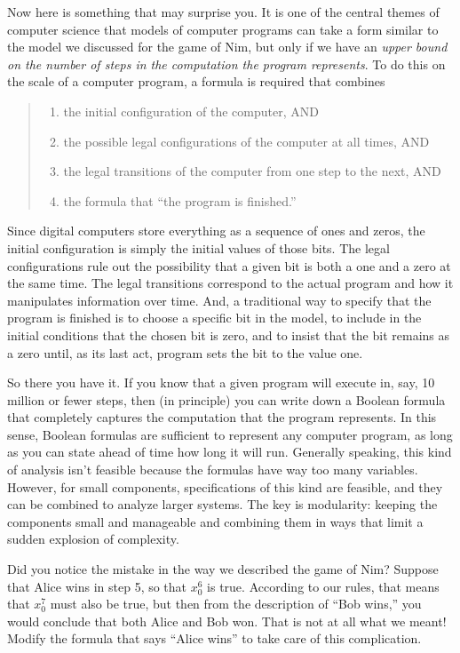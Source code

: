 {{Now here is something that may surprise you.
It is one of the central themes of computer science
that models of computer programs can take a form
similar to the model we discussed for the game of Nim,
but only if we have an \emph{upper bound on the number of
steps in the computation the program represents}.
To do this on the scale of a computer program,
a formula is required that combines
\begin{quote}
\begin{enumerate}
\item the initial configuration of the computer, AND
\item the possible legal configurations of the computer at all times, AND
\item the legal transitions of the computer from one step to the next, AND
\item the formula that ``the program is finished.''
\end{enumerate}
\end{quote}

Since digital computers store everything as a sequence of ones and zeros,
the initial configuration is simply the initial values of those bits.
The legal configurations rule out the possibility that a given bit is both a
one and a zero at the same time.
The legal transitions correspond to the actual program and how it manipulates information
over time. And, a traditional way to specify that the program is finished
is to choose a specific bit in the model, to include in the initial conditions
that the chosen bit is zero, and to insist that
the bit remains as a zero until, as its last act,
program sets the bit to the value one.

So there you have it.
If you know that a given program will execute in, say, 10 million or fewer steps,
then (in principle) you can
write down a Boolean formula that completely captures the computation
that the program represents.
In this sense, Boolean formulas are sufficient to
represent any computer program,
as long as you can state ahead of time how long it will run.
Generally speaking, this kind of analysis isn't feasible
because the formulas have way too many variables.
However, for small components,
specifications of this kind are feasible, and they can be combined
to analyze larger systems. The key is modularity: keeping the
components small and manageable and combining them in
ways that limit a sudden explosion of complexity.

\begin{ExerciseList}
\Exercise
Did you notice the mistake in the way we described the game of Nim?
Suppose that Alice wins in step 5, so that $x_{0}^{6}$ is true.
According to our rules, that means that $x_{0}^{7}$ must also be true,
but then from the description of ``Bob wins,''
you would conclude that both Alice and Bob won.
That is not at all what we meant! Modify the formula that says ``Alice wins''
to take care of this complication.


\end{ExerciseList}}}
